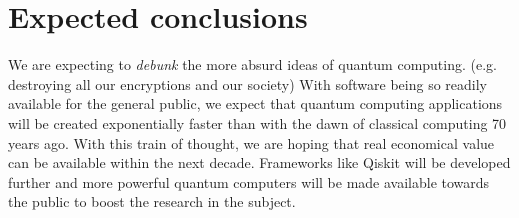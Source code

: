 \section{Expected conclusions}
\label{sec:verwachte_conclusies}

We are expecting to \emph{debunk} the more absurd ideas of quantum computing. (e.g. destroying all our encryptions and our society) With software being so readily available for the general public, we expect that quantum computing applications will be created exponentially faster than with the dawn of classical computing 70 years ago. With this train of thought, we are hoping that real economical value can be available within the next decade. Frameworks like Qiskit will be developed further and more powerful quantum computers will be made available towards the public to boost the research in the subject.

